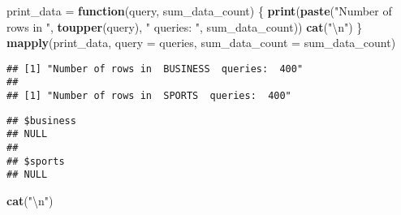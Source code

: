 \documentclass[]{article}
\newenvironment{Shaded}{\begin{snugshade}}{\end{snugshade}}
\newcommand{\KeywordTok}[1]{\textcolor[rgb]{0.13,0.29,0.53}{\textbf{#1}}}
\newcommand{\DataTypeTok}[1]{\textcolor[rgb]{0.13,0.29,0.53}{#1}}
\newcommand{\DecValTok}[1]{\textcolor[rgb]{0.00,0.00,0.81}{#1}}
\newcommand{\CharTok}[1]{\textcolor[rgb]{0.31,0.60,0.02}{#1}}
\newcommand{\StringTok}[1]{\textcolor[rgb]{0.31,0.60,0.02}{#1}}
\newcommand{\CommentTok}[1]{\textcolor[rgb]{0.56,0.35,0.01}{\textit{#1}}}
\newcommand{\ControlFlowTok}[1]{\textcolor[rgb]{0.13,0.29,0.53}{\textbf{#1}}}
\newcommand{\NormalTok}[1]{#1}
\begin{document}
\begin{Shaded}
\end{Shaded}

\newpage

\begin{Shaded}
\begin{Highlighting}[]
\NormalTok{print_data =}\StringTok{ }\ControlFlowTok{function}\NormalTok{(query, sum_data_count) \{}
    \KeywordTok{print}\NormalTok{(}\KeywordTok{paste}\NormalTok{(}\StringTok{"Number of rows in "}\NormalTok{, }\KeywordTok{toupper}\NormalTok{(query), }
        \StringTok{" queries: "}\NormalTok{, sum_data_count))}
    \KeywordTok{cat}\NormalTok{(}\StringTok{"}\CharTok{\textbackslash{}n}\StringTok{"}\NormalTok{)}
\NormalTok{\}}
\KeywordTok{mapply}\NormalTok{(print_data, }\DataTypeTok{query =}\NormalTok{ queries, }\DataTypeTok{sum_data_count =}\NormalTok{ sum_data_count)}
\end{Highlighting}
\end{Shaded}

\begin{verbatim}
## [1] "Number of rows in  BUSINESS  queries:  400"
## 
## [1] "Number of rows in  SPORTS  queries:  400"
\end{verbatim}

\begin{verbatim}
## $business
## NULL
## 
## $sports
## NULL
\end{verbatim}

\begin{Shaded}
\begin{Highlighting}[]
\KeywordTok{cat}\NormalTok{(}\StringTok{"}\CharTok{\textbackslash{}n}\StringTok{"}\NormalTok{)}
\end{Highlighting}
\end{Shaded}
\end{document}
